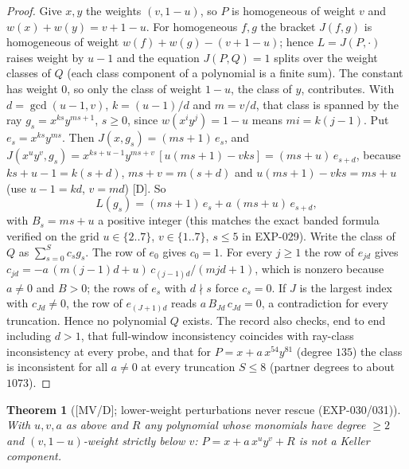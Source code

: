 \documentclass[11pt]{article}
\newtheorem{theorem}{Theorem}[section]
\theoremstyle{remark}
\begin{document}
\begin{proof}
Give $x,y$ the weights $(v, 1-u)$, so $P$ is homogeneous of weight $v$ and $w(x)+w(y)=v+1-u$. For
homogeneous $f,g$ the bracket $J(f,g)$ is homogeneous of weight $w(f)+w(g)-(v+1-u)$; hence
$L=J(P,\cdot)$ raises weight by $u-1$ and the equation $J(P,Q)=1$ splits over the weight classes of $Q$
(each class component of a polynomial is a finite sum). The constant has weight $0$, so only the class of
weight $1-u$, the class of $y$, contributes. With $d=\gcd(u-1,v)$, $k=(u-1)/d$ and $m=v/d$, that class is
spanned by the ray $g_s = x^{ks}y^{ms+1}$, $s\ge0$, since $w(x^iy^j)=1-u$ means $mi=k(j-1)$. Put
$e_s=x^{ks}y^{ms}$. Then $J(x,g_s)=(ms+1)\,e_s$, and
$J(x^uy^v,g_s)=x^{ks+u-1}y^{ms+v}\,[u(ms+1)-vks]=(ms+u)\,e_{s+d}$, because $ks+u-1=k(s+d)$,
$ms+v=m(s+d)$ and $u(ms+1)-vks=ms+u$ (use $u-1=kd$, $v=md$) [D]. So
\begin{equation}\label{eq:band}
L(g_s)=(ms+1)\,e_s+a\,(ms+u)\,e_{s+d},
\end{equation}
with $B_s=ms+u$ a positive integer (this matches the exact banded formula verified on the grid
$u\in\{2..7\}$, $v\in\{1..7\}$, $s\le5$ in EXP-029). Write the class of $Q$ as $\sum_{s=0}^{S}c_sg_s$.
The row of $e_0$ gives $c_0=1$. For every $j\ge1$ the row of $e_{jd}$ gives
$c_{jd}=-a\,(m(j-1)d+u)\,c_{(j-1)d}/(mjd+1)$, which is nonzero because $a\ne0$ and $B>0$; the rows of
$e_s$ with $d\nmid s$ force $c_s=0$. If $J$ is the largest index with $c_{Jd}\ne0$, the row of
$e_{(J+1)d}$ reads $a\,B_{Jd}\,c_{Jd}=0$, a contradiction for every truncation. Hence no polynomial $Q$
exists. The record also checks, end to end including $d>1$, that full-window inconsistency
coincides with ray-class inconsistency at every probe, and that for $P=x+a\,x^{54}y^{81}$ (degree $135$) the
class is inconsistent for all $a\ne0$ at every truncation $S\le 8$ (partner degrees to about $1073$).
\end{proof}

\begin{theorem}[{[MV/D]}; lower-weight perturbations never rescue (EXP-030/031)]\label{thm:t2}
With $u, v, a$ as above and $R$ any polynomial whose monomials have degree $\ge 2$ and
$(v, 1-u)$-weight strictly below $v$: $P = x + a\,x^u y^v + R$ is not a Keller component.
\end{theorem}
\end{document}
